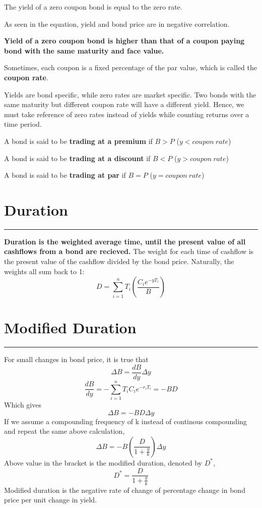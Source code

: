 \documentclass[DIV=15, fleqn, oneside, 10pt]{scrartcl}
\theoremstyle{clean}
\newcommand{\sep}{%
  \par\medskip
  \hrule
  \bigskip
}
\begin{document}
The yield of a zero coupon bond is equal to the zero rate.

As seen in the equation, yield and bond price are in negative correlation.

\textbf{Yield of a zero coupon bond is higher than that of a coupon paying bond with the same
maturity and face value.}

Sometimes, each coupon is a fixed percentage of the par value, which is called the 
\textbf{coupon rate}.

Yields are bond specific, while zero rates are market specific. Two bonds with the same maturity
but different coupon rate will have a different yield. Hence, we must take reference of zero rates
instead of yields while counting returns over a time period.


A bond is said to be \textbf{trading at a premium} if $B > P$ ($y < coupon\:rate$)

A bond is said to be \textbf{trading at a discount} if $B < P$ ($y > coupon\:rate$)

A bond is said to be \textbf{trading at par} if $B = P$ ($y = coupon\:rate$)

\section*{Duration}
\sep
\textbf{Duration is the weighted average time, until the present value of all cashflows from a bond
are recieved.} The weight for each time of cashflow is the present value of the cashflow divided
by the bond price. Naturally, the weights all sum back to 1:
\[
D = \sum_{i = 1}^{n}{T_i \left( \frac{C_i e^{-yT_i}}{B} \right)}
\]

\newpage
\section*{Modified Duration}
\sep

For small changes in bond price, it is true that
\[
\Delta B = \frac{dB}{dy} \Delta y
\]
\[
\frac{dB}{dy} = -\sum_{i = 1}^{n}{T_i C_{i} e^{-r_i T_i}} = -BD
\]
Which gives
\begin{equation}
\Delta B = -BD \Delta y
\end{equation}
If we assume a compounding frequency of k instead of continous compounding and repeat the same
above calculation,
\[
\Delta B = -B \left( \frac{D}{1 + \frac{y}{k}} \right) \Delta y
\]
Above value in the bracket is the modified duration, denoted by $D^*$,
\[D^* = 
\frac{D}{1 + \frac{y}{k}}
\]
Modified duration is the negative rate of change of percentage change in bond price per unit change
in yield.
\end{document}

